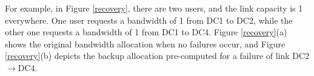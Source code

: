 \documentclass[sigconf]{acmart}
\begin{document}
 
For example, in Figure \ref{recovery}, there are two users, and the link capacity is 1 everywhere.  One user requests a bandwidth of 1 from DC1 to DC2, while the other one requests a bandwidth of 1 from DC1 to DC4.
Figure \ref{recovery}(a) shows the original bandwidth allocation when no failures occur, 
and Figure \ref{recovery}(b) depicts the backup allocation pre-computed for a failure of link DC2$\to$DC4.
\end{document}
